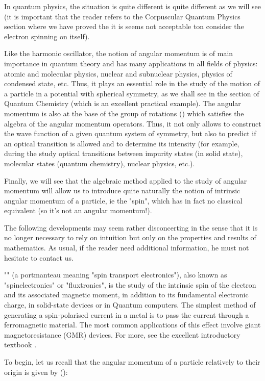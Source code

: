 	In quantum physics, the situation is quite different is quite different as we will see (it is important that the reader refers to the Corpuscular Quantum Physics section where we have proved the it is seems not acceptable ton consider the electron spinning on itself).

	Like the harmonic oscillator, the notion of angular momentum is of main importance in quantum theory and has many applications in all fields of physics: atomic and molecular physics, nuclear and subnuclear physics, physics of condensed state, etc. Thus, it plays an essential role in the study of the motion of a particle in a potential with spherical symmetry, as we shall see in the section of Quantum Chemistry (which is an excellent practical example). The angular momentum is also at the base of the group of rotations () which satisfies the algebra of the angular momentum operators. Thus, it not only allows to construct the wave function of a given quantum system of symmetry, but also to predict if an optical transition is allowed and to determine its intensity (for example, during the study optical transitions between impurity states (in solid state), molecular states (quantum chemistry), nuclear physics, etc.).
	
	Finally, we will see that the algebraic method applied to the study of angular momentum will allow us to introduce quite naturally the notion of intrinsic angular momentum of a particle, ie the "spin", which has in fact no classical equivalent (so it's not an angular momentum!).

	The following developments may seem rather disconcerting in the sense that it is no longer necessary to rely on intuition but only on the properties and results of mathematics. As usual, if the reader need additional information, he must not hesitate to contact us.
	\begin{tcolorbox}[title=Remark,colframe=black,arc=10pt]
	"" (a portmanteau meaning "spin transport electronics"), also known as "spinelectronics" or "fluxtronics", is the study of the intrinsic spin of the electron and its associated magnetic moment, in addition to its fundamental electronic charge, in solid-state devices or in Quantum computers. The simplest method of generating a spin-polarised current in a metal is to pass the current through a ferromagnetic material. The most common applications of this effect involve giant magnetoresistance (GMR) devices. For more, see the excellent introductory textbook \cite{bandyopadhyay2008introduction}.
	\end{tcolorbox}
	To begin, let us recall that the angular momentum of a particle relatively to their origin is given by ():
	
